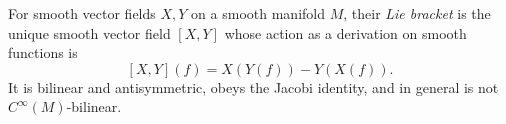 
For smooth vector fields $X,Y$ on a smooth manifold $M$, their \emph{Lie bracket} is the unique smooth vector field $[X,Y]$ whose action as a derivation on smooth functions is
\[
[X,Y](f)=X(Y(f))-Y(X(f)).
\]
It is bilinear and antisymmetric, obeys the Jacobi identity, and in general is not $C^\infty(M)$-bilinear.
